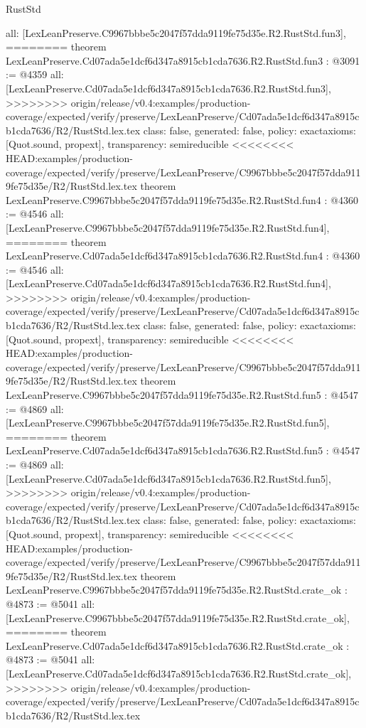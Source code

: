 \begin{lexlean}{RustStd}
\begin{coremodule}
{\begin{coremodule}
{{{{{{  all: [LexLeanPreserve.C9967bbbe5c2047f57dda9119fe75d35e.R2.RustStd.fun3],
========
theorem LexLeanPreserve.Cd07ada5e1dcf6d347a8915cb1cda7636.R2.RustStd.fun3 : @3091 := @4359 {
  all: [LexLeanPreserve.Cd07ada5e1dcf6d347a8915cb1cda7636.R2.RustStd.fun3],
>>>>>>>> origin/release/v0.4:examples/production-coverage/expected/verify/preserve/LexLeanPreserve/Cd07ada5e1dcf6d347a8915cb1cda7636/R2/RustStd.lex.tex
  class: false,
  generated: false,
  policy: exact{axioms: [Quot.sound, propext]},
  transparency: semireducible
}
<<<<<<<< HEAD:examples/production-coverage/expected/verify/preserve/LexLeanPreserve/C9967bbbe5c2047f57dda9119fe75d35e/R2/RustStd.lex.tex
theorem LexLeanPreserve.C9967bbbe5c2047f57dda9119fe75d35e.R2.RustStd.fun4 : @4360 := @4546 {
  all: [LexLeanPreserve.C9967bbbe5c2047f57dda9119fe75d35e.R2.RustStd.fun4],
========
theorem LexLeanPreserve.Cd07ada5e1dcf6d347a8915cb1cda7636.R2.RustStd.fun4 : @4360 := @4546 {
  all: [LexLeanPreserve.Cd07ada5e1dcf6d347a8915cb1cda7636.R2.RustStd.fun4],
>>>>>>>> origin/release/v0.4:examples/production-coverage/expected/verify/preserve/LexLeanPreserve/Cd07ada5e1dcf6d347a8915cb1cda7636/R2/RustStd.lex.tex
  class: false,
  generated: false,
  policy: exact{axioms: [Quot.sound, propext]},
  transparency: semireducible
}
<<<<<<<< HEAD:examples/production-coverage/expected/verify/preserve/LexLeanPreserve/C9967bbbe5c2047f57dda9119fe75d35e/R2/RustStd.lex.tex
theorem LexLeanPreserve.C9967bbbe5c2047f57dda9119fe75d35e.R2.RustStd.fun5 : @4547 := @4869 {
  all: [LexLeanPreserve.C9967bbbe5c2047f57dda9119fe75d35e.R2.RustStd.fun5],
========
theorem LexLeanPreserve.Cd07ada5e1dcf6d347a8915cb1cda7636.R2.RustStd.fun5 : @4547 := @4869 {
  all: [LexLeanPreserve.Cd07ada5e1dcf6d347a8915cb1cda7636.R2.RustStd.fun5],
>>>>>>>> origin/release/v0.4:examples/production-coverage/expected/verify/preserve/LexLeanPreserve/Cd07ada5e1dcf6d347a8915cb1cda7636/R2/RustStd.lex.tex
  class: false,
  generated: false,
  policy: exact{axioms: [Quot.sound, propext]},
  transparency: semireducible
}
<<<<<<<< HEAD:examples/production-coverage/expected/verify/preserve/LexLeanPreserve/C9967bbbe5c2047f57dda9119fe75d35e/R2/RustStd.lex.tex
theorem LexLeanPreserve.C9967bbbe5c2047f57dda9119fe75d35e.R2.RustStd.crate_ok : @4873 := @5041 {
  all: [LexLeanPreserve.C9967bbbe5c2047f57dda9119fe75d35e.R2.RustStd.crate_ok],
========
theorem LexLeanPreserve.Cd07ada5e1dcf6d347a8915cb1cda7636.R2.RustStd.crate_ok : @4873 := @5041 {
  all: [LexLeanPreserve.Cd07ada5e1dcf6d347a8915cb1cda7636.R2.RustStd.crate_ok],
>>>>>>>> origin/release/v0.4:examples/production-coverage/expected/verify/preserve/LexLeanPreserve/Cd07ada5e1dcf6d347a8915cb1cda7636/R2/RustStd.lex.tex
}}}}}}}}}}
\end{coremodule}}
\end{coremodule}
\end{lexlean}
